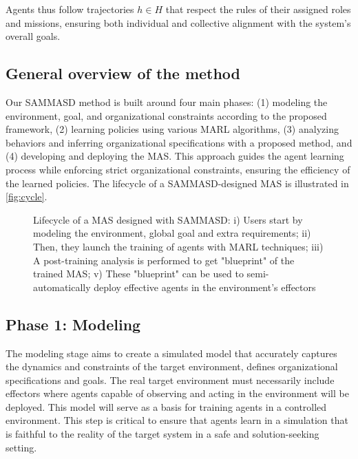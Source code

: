 \documentclass[conference]{IEEEtran}
\begin{document}
\noindent Agents thus follow trajectories $h \in H$ that respect the rules of their assigned roles and missions, ensuring both individual and collective alignment with the system's overall goals.


\subsection{General overview of the method}

Our SAMMASD method is built around four main phases: (1) modeling the environment, goal, and organizational constraints according to the proposed framework, (2) learning policies using various MARL algorithms, (3) analyzing behaviors and inferring organizational specifications with a proposed method, and (4) developing and deploying the MAS. This approach guides the agent learning process while enforcing strict organizational constraints, ensuring the efficiency of the learned policies. The lifecycle of a SAMMASD-designed MAS is illustrated in \autoref{fig:cycle}.



\begin{figure}[h!]
  \centering
  
  \caption{Lifecycle of a MAS designed with SAMMASD: i) Users start by modeling the environment, global goal and extra requirements; \quad ii) Then, they launch the training of agents with MARL techniques; \quad iii) A post-training analysis is performed to get "blueprint" of the trained MAS; \quad v) These "blueprint" can be used to semi-automatically deploy effective agents in the environment's effectors}
  \label{fig:cycle}
\end{figure}



\subsection{Phase 1: Modeling}

The modeling stage aims to create a simulated model that accurately captures the dynamics and constraints of the target environment, defines organizational specifications and goals. The real target environment must necessarily include effectors where agents capable of observing and acting in the environment will be deployed. This model will serve as a basis for training agents in a controlled environment. This step is critical to ensure that agents learn in a simulation that is faithful to the reality of the target system in a safe and solution-seeking setting.
\end{document}
